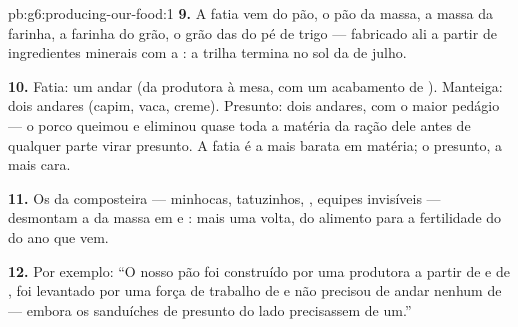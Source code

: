 \begin{solution}{pb:g6:producing-our-food:1}
\textbf{9.} A fatia vem do pão, o pão da massa, a massa da farinha, a
farinha do grão, o grão das  do pé de trigo --- fabricado ali a
partir de ingredientes minerais com a : a trilha termina no sol da
 de julho.

\textbf{10.} Fatia: um andar (da produtora à mesa, com um acabamento
de ). Manteiga: dois andares (capim, vaca, creme). Presunto:
dois andares, com o maior pedágio --- o porco queimou e eliminou quase
toda a matéria da ração dele antes de qualquer parte virar presunto. A
fatia é a mais barata em matéria; o presunto, a mais cara.

\textbf{11.} Os  da composteira --- minhocas,
tatuzinhos, , equipes invisíveis --- desmontam a  da massa em  e : mais uma volta, do
alimento para a fertilidade do  do ano que vem.

\textbf{12.} Por exemplo: ``O nosso pão foi construído por uma
produtora a partir de  e de , foi levantado por uma
força de trabalho de  e não precisou de andar nenhum de
 --- embora os sanduíches de presunto do lado precisassem de
um.''
\end{solution}
